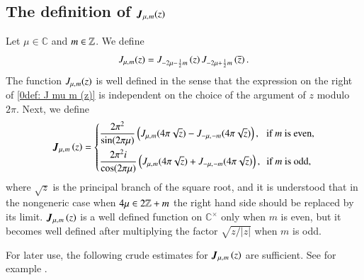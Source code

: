 \documentclass{amsproc}
\newcommand{\BC}{{\mathbb {C}}} \newcommand{\BD}{{\mathbb {D}}}
\def\lp {\left (}
\def\rp {\right )}
\def\BCx{\BC^{\times}}
\renewcommand{\Re}{{\mathrm{Re}\,}}
\def\bfJ {\boldsymbol J}
\def\shskip{\hskip 0.5 pt}
\theoremstyle{plain}
\numberwithin{equation}{section}
\begin{document}
	\subsection{The definition of $  \bfJ_{\mu,\shskip   m} (z)$} \label{sec: defn of J(z)}
	Let $\mu \in \BC $   and $m \in {\mathbb {Z}} $.
	We define
	\begin{equation}\label{0def: J mu m (z)}
	J_{\mu,\shskip   m} (z) = J_{- 2\mu - \frac 12 m } \lp  z \rp J_{- 2\mu + \frac 12 m  } \lp  {\overline z} \rp.
	\end{equation}
	The function $J_{\mu,\shskip   m} (z)$ is well defined in the sense that the   expression on the right of \eqref{0def: J mu m (z)} is independent on the choice of the argument of $z$ modulo $2 \pi$. Next, we define
	\begin{equation}\label{0eq: defn of Bessel}
	\bfJ_{ \mu,\shskip   m} \lp z \rp =
	\left\{
	\begin{split}
	& \frac {2 \pi^2} {\sin (2\pi \mu)} \lp J_{\mu,\shskip   m} (4 \pi \sqrt z) -  J_{-\mu,\shskip   -m} (4 \pi \sqrt z) \rp, \hskip 6.5 pt \text {if } m \text{ is even},\\
	& \frac {2 \pi^2 i} {\cos (2\pi \mu)} \lp J_{\mu,\shskip   m} (4 \pi \sqrt z) + J_{-\mu,\shskip   -m} (4 \pi \sqrt z) \rp, \hskip 5 pt \text {if }  m \text{ is odd},
	\end{split}
	\right.
	\end{equation}
	where $\sqrt z$ is the principal branch of the square root, and it is understood that in the nongeneric case when  $4 \mu \in 2{\mathbb {Z}} + m$ the right hand side should be replaced by its limit.  $\bfJ_{ \mu,\shskip   m} \lp z \rp$ is a well defined function on $\BCx$ only when $m$ is even, but it becomes    well defined after multiplying the factor $\sqrt {  z / |z|}  $ when $m$ is odd.
	
	For later use, the following crude estimates for $\bfJ_{ \mu,\shskip   m} \lp z \rp$  are sufficient. See for example  \cite[(2.28)]{Qi-II-G}. %
	
\end{document}
